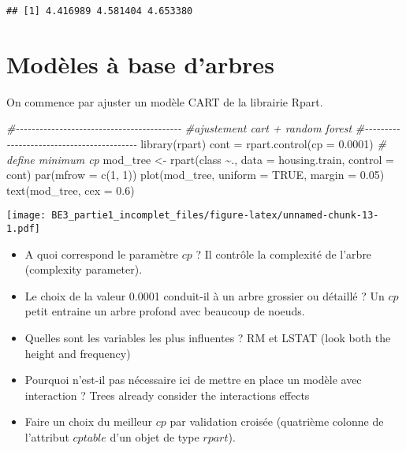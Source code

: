 \documentclass[
]{article}
\newenvironment{Shaded}{\begin{snugshade}}{\end{snugshade}}
\newcommand{\AttributeTok}[1]{\textcolor[rgb]{0.77,0.63,0.00}{#1}}
\newcommand{\CommentTok}[1]{\textcolor[rgb]{0.56,0.35,0.01}{\textit{#1}}}
\newcommand{\ConstantTok}[1]{\textcolor[rgb]{0.00,0.00,0.00}{#1}}
\newcommand{\DecValTok}[1]{\textcolor[rgb]{0.00,0.00,0.81}{#1}}
\newcommand{\FloatTok}[1]{\textcolor[rgb]{0.00,0.00,0.81}{#1}}
\newcommand{\FunctionTok}[1]{\textcolor[rgb]{0.00,0.00,0.00}{#1}}
\newcommand{\NormalTok}[1]{#1}
\newcommand{\OtherTok}[1]{\textcolor[rgb]{0.56,0.35,0.01}{#1}}
\newcommand{\SpecialCharTok}[1]{\textcolor[rgb]{0.00,0.00,0.00}{#1}}
\begin{document}
\begin{verbatim}
## [1] 4.416989 4.581404 4.653380
\end{verbatim}

\hypertarget{moduxe8les-uxe0-base-darbres}{%
\section{Modèles à base d'arbres}\label{moduxe8les-uxe0-base-darbres}}

On commence par ajuster un modèle CART de la librairie Rpart.

\begin{Shaded}
\begin{Highlighting}[]
\CommentTok{\#{-}{-}{-}{-}{-}{-}{-}{-}{-}{-}{-}{-}{-}{-}{-}{-}{-}{-}{-}{-}{-}{-}{-}{-}{-}{-}{-}{-}{-}{-}{-}{-}{-}{-}{-}{-}{-}{-}{-}{-}{-}{-}}
\CommentTok{\#ajustement cart + random forest}
\CommentTok{\#{-}{-}{-}{-}{-}{-}{-}{-}{-}{-}{-}{-}{-}{-}{-}{-}{-}{-}{-}{-}{-}{-}{-}{-}{-}{-}{-}{-}{-}{-}{-}{-}{-}{-}{-}{-}{-}{-}{-}{-}{-}{-}}
\FunctionTok{library}\NormalTok{(rpart)}
\NormalTok{cont }\OtherTok{=} \FunctionTok{rpart.control}\NormalTok{(}\AttributeTok{cp =} \FloatTok{0.0001}\NormalTok{)  }\CommentTok{\# define minimum cp}
\NormalTok{mod\_tree }\OtherTok{\textless{}{-}} \FunctionTok{rpart}\NormalTok{(class }\SpecialCharTok{\textasciitilde{}}\NormalTok{., }\AttributeTok{data =}\NormalTok{ housing.train, }\AttributeTok{control =}\NormalTok{ cont)}
\FunctionTok{par}\NormalTok{(}\AttributeTok{mfrow =} \FunctionTok{c}\NormalTok{(}\DecValTok{1}\NormalTok{, }\DecValTok{1}\NormalTok{))}
\FunctionTok{plot}\NormalTok{(mod\_tree, }\AttributeTok{uniform =} \ConstantTok{TRUE}\NormalTok{, }\AttributeTok{margin =} \FloatTok{0.05}\NormalTok{)}
\FunctionTok{text}\NormalTok{(mod\_tree, }\AttributeTok{cex =} \FloatTok{0.6}\NormalTok{)}
\end{Highlighting}
\end{Shaded}

\texttt{[image: BE3\_partie1\_incomplet\_files/figure-latex/unnamed-chunk-13-1.pdf]}

\begin{itemize}
\item
  A quoi correspond le paramètre \(\textit{cp}\) ? Il contrôle la
  complexité de l'arbre (complexity parameter).
\item
  Le choix de la valeur 0.0001 conduit-il à un arbre grossier ou
  détaillé ? Un \(\textit{cp}\) petit entraine un arbre profond avec
  beaucoup de noeuds.
\item
  Quelles sont les variables les plus influentes ? RM et LSTAT (look
  both the height and frequency)
\item
  Pourquoi n'est-il pas nécessaire ici de mettre en place un modèle avec
  interaction ? Trees already consider the interactions effects
\item
  Faire un choix du meilleur \(\textit{cp}\) par validation croisée
  (quatrième colonne de l'attribut \(\textit{cptable}\) d'un objet de
  type \(\textit{rpart}\)).
\end{itemize}
\end{document}
